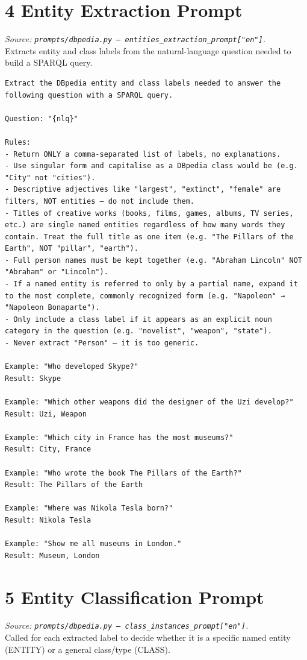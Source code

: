 \documentclass[11pt,a4paper]{article}
\begin{document}
\section{4 \quad Entity Extraction Prompt}
\textit{Source: \texttt{prompts/dbpedia.py --- entities\_extraction\_prompt["en"]}.}\\
Extracts entity and class labels from the natural-language question needed to build a SPARQL query.

\begin{lstlisting}[style=prompt]
Extract the DBpedia entity and class labels needed to answer the following question with a SPARQL query.

Question: "{nlq}"

Rules:
- Return ONLY a comma-separated list of labels, no explanations.
- Use singular form and capitalise as a DBpedia class would be (e.g. "City" not "cities").
- Descriptive adjectives like "largest", "extinct", "female" are filters, NOT entities — do not include them.
- Titles of creative works (books, films, games, albums, TV series, etc.) are single named entities regardless of how many words they contain. Treat the full title as one item (e.g. "The Pillars of the Earth", NOT "pillar", "earth").
- Full person names must be kept together (e.g. "Abraham Lincoln" NOT "Abraham" or "Lincoln").
- If a named entity is referred to only by a partial name, expand it to the most complete, commonly recognized form (e.g. "Napoleon" → "Napoleon Bonaparte").
- Only include a class label if it appears as an explicit noun category in the question (e.g. "novelist", "weapon", "state").
- Never extract "Person" — it is too generic.

Example: "Who developed Skype?"
Result: Skype

Example: "Which other weapons did the designer of the Uzi develop?"
Result: Uzi, Weapon

Example: "Which city in France has the most museums?"
Result: City, France

Example: "Who wrote the book The Pillars of the Earth?"
Result: The Pillars of the Earth

Example: "Where was Nikola Tesla born?"
Result: Nikola Tesla

Example: "Show me all museums in London."
Result: Museum, London
\end{lstlisting}

\section{5 \quad Entity Classification Prompt}
\textit{Source: \texttt{prompts/dbpedia.py --- class\_instances\_prompt["en"]}.}\\
Called for each extracted label to decide whether it is a specific named entity (ENTITY) or a general class/type (CLASS).
\end{document}
